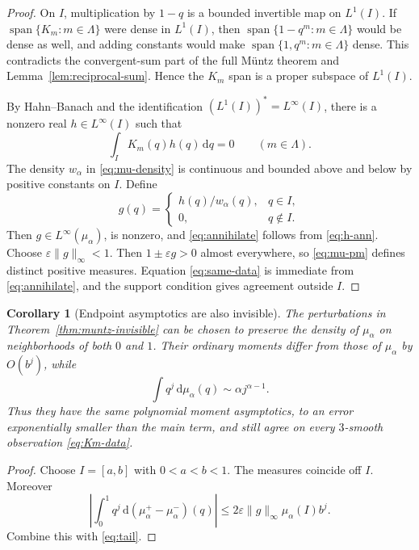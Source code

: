 \documentclass[11pt,oneside]{article}
\newtheorem{corollary}[theorem]{Corollary}
\theoremstyle{definition}
\theoremstyle{remark}
\newcommand{\dd}{\,\mathrm d}
\newcommand{\Span}{\operatorname{span}}
\begin{document}
\begin{proof}
On $I$, multiplication by $1-q$ is a bounded invertible map on $L^1(I)$.  If
$\Span\{K_m:m\in\Lambda\}$ were dense in $L^1(I)$, then
$\Span\{1-q^m:m\in\Lambda\}$ would be dense as well, and adding constants would make
$\Span\{1,q^m:m\in\Lambda\}$ dense.  This contradicts the convergent-sum part of the full
M\"untz theorem and Lemma~\ref{lem:reciprocal-sum}.  Hence the $K_m$ span is a proper
subspace of $L^1(I)$.

By Hahn--Banach and the identification $(L^1(I))^*=L^\infty(I)$, there is a nonzero real
$h\in L^\infty(I)$ such that
\begin{equation}\label{eq:h-ann}
 \int_IK_m(q)h(q)\dd q=0
 \qquad(m\in\Lambda).
\end{equation}
The density $w_\alpha$ in \eqref{eq:mu-density} is continuous and bounded above and below by
positive constants on $I$.  Define
\[
 g(q)=\begin{cases}
 h(q)/w_\alpha(q),&q\in I,\\
 0,&q\notin I.
 \end{cases}
\]
Then $g\in L^\infty(\mu_\alpha)$, is nonzero, and \eqref{eq:annihilate} follows from
\eqref{eq:h-ann}.  Choose $\varepsilon\|g\|_\infty<1$.  Then
$1\pm\varepsilon g>0$ almost everywhere, so \eqref{eq:mu-pm} defines distinct positive
measures.  Equation \eqref{eq:same-data} is immediate from \eqref{eq:annihilate}, and the
support condition gives agreement outside $I$.
\end{proof}

\begin{corollary}[Endpoint asymptotics are also invisible]\label{cor:endpoint-invisible}
The perturbations in Theorem~\ref{thm:muntz-invisible} can be chosen to preserve the density of
$\mu_\alpha$ on neighborhoods of both $0$ and $1$.  Their ordinary moments differ from those
of $\mu_\alpha$ by $O(b^j)$, while
\[
 \int q^j\dd\mu_\alpha(q)\sim\alpha j^{\alpha-1}.
\]
Thus they have the same polynomial moment asymptotics, to an error exponentially smaller than
the main term, and still agree on every $3$-smooth observation \eqref{eq:Km-data}.
\end{corollary}

\begin{proof}
Choose $I=[a,b]$ with $0<a<b<1$.  The measures coincide off $I$.  Moreover
\[
 \left|\int_0^1q^j\dd(\mu_\alpha^+-\mu_\alpha^-)(q)\right|
 \le 2\varepsilon\|g\|_\infty\mu_\alpha(I)b^j.
\]
Combine this with \eqref{eq:tail}.
\end{proof}
\end{document}
